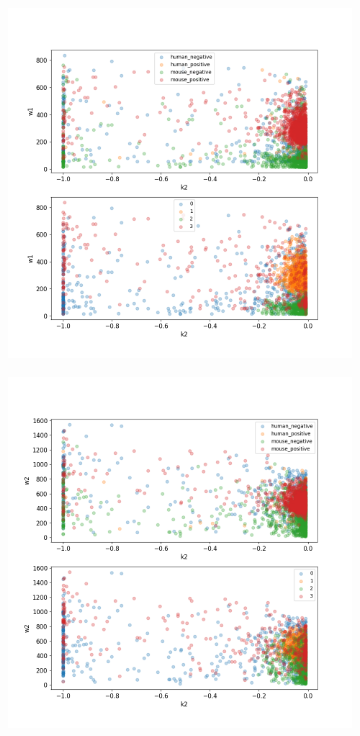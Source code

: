 \begin{figure}
	\begin{subfigure}{0.45\textwidth}
		\includegraphics[width=\textwidth]{fig/seperate_k2_w1}
	\end{subfigure}
	\hfill
	\begin{subfigure}{0.45\textwidth}
		\includegraphics[width=\textwidth]{fig/seperate_k2_w2}

\end{subfigure}
\end{figure}
